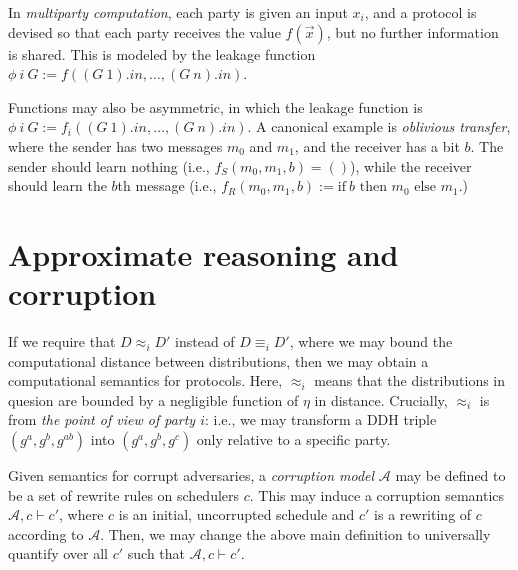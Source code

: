\documentclass{article}
\begin{document}
In \emph{multiparty computation}, each party is given an input $x_i$, and a protocol is devised so that each party receives the value $f(\vec{x})$, but no further information is shared. This is modeled by the leakage function $\phi\ i\ G := f((G\ 1).in, \dots, (G\ n).in)$.

Functions may also be asymmetric, in which the leakage function is $\phi\ i\ G := f_i((G\ 1).in, \dots, (G\ n).in)$. A canonical example is \emph{oblivious transfer}, where the sender has two messages $m_0$ and $m_1$, and the receiver has a bit $b$. The sender should learn nothing (i.e., $f_S (m_0, m_1, b) = ()$), while the receiver should learn the $b$th message (i.e., $f_R (m_0, m_1, b) := \text{if}\ b \text{ then } m_0 \text{ else } m_1.$)


\section{Approximate reasoning and corruption}

If we require that $D \approx_i D'$ instead of $D \equiv_i D'$, where we may bound the computational distance between distributions, then we may obtain a computational semantics for protocols. Here, $\approx_i$ means that the distributions in quesion are bounded by a negligible function of $\eta$ in distance. Crucially, $\approx_i$ is from \emph{the point of view of party $i$}: i.e., we may transform a DDH triple $(g^a, g^b, g^{ab})$ into $(g^a, g^b, g^c)$ only relative to a specific party. 

Given semantics for corrupt adversaries, a \emph{corruption model} $\mathcal{A}$ may be defined to be a set of rewrite rules on schedulers $c$. This may induce a corruption semantics $\mathcal{A}, c \vdash c'$, where $c$ is an initial, uncorrupted schedule and $c'$ is a rewriting of $c$ according to $\mathcal{A}$. Then, we may change the above main definition to universally quantify over all $c'$ such that $\mathcal{A}, c \vdash c'$.
\end{document}
